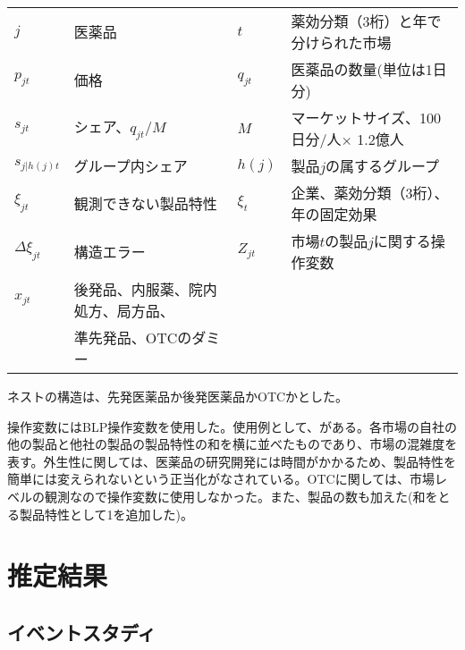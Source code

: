 \documentclass[a4paper,11pt,uplatex]{jsarticle}
\theoremstyle{definition}
\begin{document}
\begin{table}[H]\centering \caption{}
    \small
    \begin{tabular}{llll}
        \toprule \label{tab:demand_var}
        \(j\) & 医薬品&$t$ &薬効分類（3桁）と年で分けられた市場 \\
        $p_{jt}$ &価格 & $q_{jt}$ &医薬品の数量(単位は1日分)\\ 
        $s_{jt}$ &シェア、$q_{jt}/M$ & $M$ &マーケットサイズ、100日分/人$\times$ 1.2億人\\
        $s_{j|h(j)t}$ & グループ内シェア & $h(j)$ &製品\(j\)の属するグループ\\
        $\xi_{jt}$ & 観測できない製品特性& $\xi_t$ &企業、薬効分類（3桁）、年の固定効果 \\
        $\Delta \xi_{jt}$ & 構造エラー &$Z_{jt}$ &市場\(t\)の製品\(j\)に関する操作変数 \\
        $x_{jt}$ & 後発品、内服薬、院内処方、局方品\footnotemark、& &  \\
         & 準先発品\footnotemark、OTCのダミー & &\\
         \bottomrule
    \end{tabular}
\end{table}
\addtocounter{footnote}{-1}
\addtocounter{footnote}{1}
ネストの構造は、先発医薬品か後発医薬品かOTCかとした。

操作変数にはBLP操作変数を使用した。使用例として、\cite{Iizuka2007}がある。各市場の自社の他の製品と他社の製品の製品特性の和を横に並べたものであり、市場の混雑度を表す。外生性に関しては、医薬品の研究開発には時間がかかるため、製品特性を簡単には変えられないという正当化がなされている。OTCに関しては、市場レベルの観測なので操作変数に使用しなかった。また、製品の数も加えた(和をとる製品特性として1を追加した)。

\section{推定結果} 
\subsection{イベントスタディ}
\end{document}
